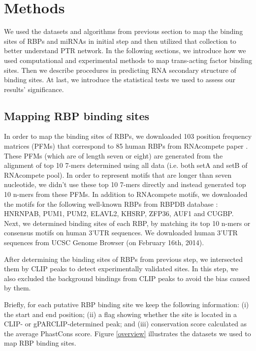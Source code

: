 \section{Methods}

We used the datasets and algorithms from previous section to map the binding sites of RBPs and miRNAs in initial step and then utilized that collection to better understand PTR network. In the following sections, we introduce how we used computational and experimental methods to map trans-acting factor binding sites. Then we describe procedures in predicting RNA secondary structure of binding sites. At last, we introduce the statistical tests we used to assess our results' significance.

\subsection{Mapping RBP binding sites}

In order to map the binding sites of RBPs, we downloaded 103 position frequency matrices (PFMs) that correspond to 85 human RBPs from RNAcompete paper \cite{rnacompete_13}. These PFMs (which are of length seven or eight) are generated from the alignment of top 10 7-mers determined using all data (i.e. both setA and setB of RNAcompete pool). In order to represent motifs that are longer than seven nucleotide, we didn't use these top 10 7-mers directly and instead generated top 10 n-mers from these PFMs. In addition to RNAcompete motifs, we downloaded the motifs for the following well-known RBPs from RBPDB database \cite{rbpdb_11}: HNRNPAB, PUM1, PUM2, ELAVL2, KHSRP, ZFP36, AUF1 and CUGBP. Next, we determined binding sites of each RBP, by matching its top 10 n-mers or consensus motifs on human 3'UTR sequences. We downloaded human 3'UTR sequences from UCSC Genome Browser (on February 16th, 2014). 

After determining the binding sites of RBPs from previous step, we intersected them by CLIP peaks to detect experimentally validated sites. In this step, we also excluded the background bindings from CLIP peaks to avoid the bias caused by them.

Briefly, for each putative RBP binding site we keep the following information: (i) the start and end position; (ii) a flag showing whether the site is located in a CLIP- or gPARCLIP-determined peak; and (iii) conservation score calculated as the average PhastCons score. Figure \ref{overview} illustrates the datasets we used to map RBP binding sites.


